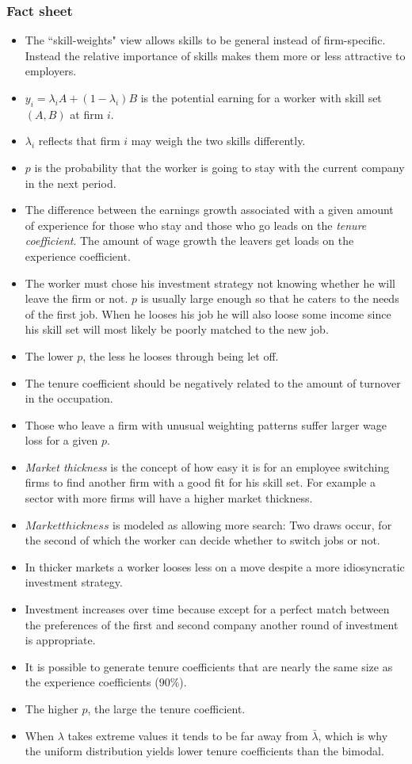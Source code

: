 \documentclass[12pt,a4paper]{article}
\begin{document}
  \subsubsection{Fact sheet} %
  \begin{itemize}
    \item The ``skill-weights" view allows skills to be general instead of firm-specific. Instead the relative importance of skills makes them more or less attractive to employers.
    \item $y_i = \lambda_i A+(1-\lambda_i)B$ is the potential earning for a worker with skill set $(A, B)$ at firm $i$.
    \item $\lambda_i$ reflects that firm $i$ may weigh the two skills differently.
    \item $p$ is the probability that the worker is going to stay with the current company in the next period.
    \item The difference between the earnings growth associated with a given amount of experience for those who stay and those who go leads on the \emph{tenure coefficient}. The amount of wage growth the leavers get loads on the experience coefficient.
    \item The worker must chose his investment strategy not knowing whether he will leave the firm or not. $p$ is usually large enough so that he caters to the needs of the first job. When he looses his job he will also loose some income since his skill set will most likely be poorly matched to the new job.
    \item The lower $p$, the less he looses through being let off.
    \item The tenure coefficient should be negatively related to the amount of turnover in the occupation.
    \item Those who leave a firm with unusual weighting patterns suffer larger wage loss for a given $p$.
    \item \emph{Market thickness} is the concept of how easy it is for an employee switching firms to find another firm with a good fit for his skill set. For example a sector with more firms will have a higher market thickness.
    \item $Market thickness$ is modeled as allowing more search: Two draws occur, for the second of which the worker can decide whether to switch jobs or not.
    \item In thicker markets a worker looses less on a move despite a more idiosyncratic investment strategy.
    \item Investment increases over time because except for a perfect match between the preferences of the first and second company another round of investment is appropriate.
    \item It is possible to generate tenure coefficients that are nearly the same size as the experience coefficients ($90\%$).
    \item The higher $p$, the large the tenure coefficient.
    \item When $\lambda$ takes extreme values it tends to be far away from $\bar{\lambda}$, which is why the uniform distribution yields lower tenure coefficients than the bimodal.
    \end{itemize}
\end{document}
